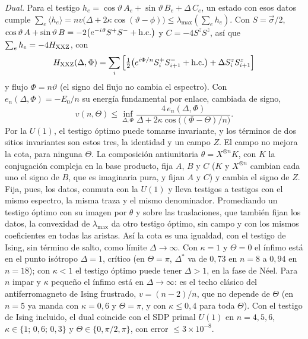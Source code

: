 \documentclass[11pt,a4paper]{article}
\theoremstyle{remark}
\newcommand{\ev}[1]{\langle #1\rangle}
\begin{document}
\emph{Dual.} Para el testigo $h_e=\cos\vartheta\,A_e+\sin\vartheta\,B_e+\Delta\,C_e$, un estado con esos
datos cumple $\sum_e\ev{h_e}=nv\big(\Delta+2\kappa\cos(\vartheta-\phi)\big)\le\lambda_{\max}(\sum_eh_e)$.
Con $S=\vec\sigma/2$, $\cos\vartheta\,A+\sin\vartheta\,B=-2\big(e^{-i\vartheta}S^+S^-+{\rm h.c.}\big)$ y
$C=-4S^zS^z$, así que $\sum_eh_e=-4H_{\rm XXZ}$, con
\[
  H_{\rm XXZ}(\Delta,\Phi)=\sum_i\Big[\tfrac12\big(e^{i\Phi/n}S^+_iS^-_{i+1}+{\rm h.c.}\big)+\Delta S^z_iS^z_{i+1}\Big]
\]
y flujo $\Phi=n\vartheta$ (el signo del flujo no cambia el espectro). Con
$e_n(\Delta,\Phi)=-E_0/n$ su energía fundamental por enlace, cambiada de signo,
\[
  v(n,\Theta)\le\inf_{\Delta,\Phi}\frac{4\,e_n(\Delta,\Phi)}{\Delta+2\kappa\cos\big((\Phi-\Theta)/n\big)}.
\]
Por la $U(1)$, el testigo óptimo puede tomarse invariante, y los términos de dos sitios invariantes
son estos tres, la identidad y un campo $Z$. El campo no mejora la cota, para ninguna $\Theta$. La
composición antiunitaria $\theta=X^{\otimes n}K$, con $K$ la conjugación compleja en la base
producto, fija $A$, $B$ y $C$ ($K$ y $X^{\otimes n}$ cambian cada uno el signo de $B$, que es
imaginaria pura, y fijan $A$ y $C$) y cambia el signo de $Z$. Fija, pues, los datos, conmuta con la
$U(1)$ y lleva testigos a testigos con el mismo espectro, la misma traza y el mismo denominador.
Promediando un testigo óptimo con su imagen por $\theta$ y sobre las traslaciones, que también fijan
los datos, la convexidad de $\lambda_{\max}$ da otro testigo óptimo, sin campo y con los mismos
coeficientes en todas las aristas. Así la cota es una igualdad, con el testigo de Ising, sin término
de salto, como límite $\Delta\to\infty$.
Con $\kappa=1$ y $\Theta=0$ el ínfimo está en el punto isótropo $\Delta=1$, crítico (en
$\Theta=\pi$, $\Delta^\ast$ va de $0{,}73$ en $n=8$ a $0{,}94$ en $n=18$); con $\kappa<1$ el testigo
óptimo puede tener $\Delta>1$, en la fase de Néel. Para $n$
impar y $\kappa$ pequeño el ínfimo está en $\Delta\to\infty$: es el techo clásico del antiferromagneto
de Ising frustrado, $v=(n-2)/n$, que no depende de $\Theta$ (en $n=5$ ya manda con $\kappa=0{,}6$ y $\Theta=\pi$, y
con $\kappa\le0{,}4$ para toda $\Theta$). Con el testigo de Ising incluido, el dual coincide con el SDP primal $U(1)$ en $n=4,5,6$,
$\kappa\in\{1;\,0{,}6;\,0{,}3\}$ y $\Theta\in\{0,\pi/2,\pi\}$, con error $\le3\times10^{-8}$.
\end{document}
